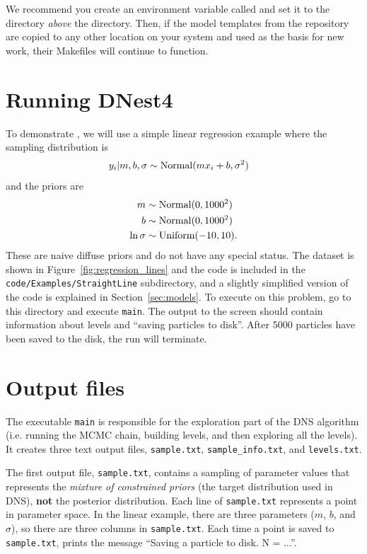 \documentclass[article, nojss]{jss}
\begin{document}
We recommend you create an environment variable called 
and set it to the directory {\em above} the  directory. Then,
if the model templates from the  repository are copied
to any other location on your system and used as the basis for
new work, their Makefiles will continue to function.

\section{Running DNest4}\label{sec:running}
To demonstrate ,
we will use a simple linear regression example where the
sampling distribution is
\begin{align}
y_i | m, b, \sigma &\sim \textnormal{Normal}(mx_i + b, \sigma^2)
\end{align}
and the priors are
\begin{align}
m &\sim \textnormal{Normal}(0, 1000^2)\\
b &\sim \textnormal{Normal}(0, 1000^2)\\
\ln\sigma &\sim \textnormal{Uniform}(-10, 10).
\end{align}
These are naive diffuse priors and do not have any special status.
The dataset is shown in Figure~\ref{fig:regression_lines}
and the code is included in the {\tt code/Examples/StraightLine}
subdirectory, and a slightly simplified version of the
code is explained in Section~\ref{sec:models}.
To execute  on this problem, go to this directory and
execute {\tt main}. The output to the screen
should contain information about levels and ``saving particles to disk''.
After 5000 particles have been saved to the disk, the run will terminate.

\section{Output files}
The executable {\tt main} is responsible for the exploration part of the
DNS algorithm (i.e. running the MCMC chain, building
levels, and then exploring all the levels). It creates three text output files,
{\tt sample.txt}, {\tt sample\_info.txt}, and {\tt levels.txt}.

The first output
file, {\tt sample.txt}, contains a sampling of parameter values that
represents the {\it mixture of constrained priors} (the target distribution
used in DNS), {\bf not} the
posterior distribution. Each line of {\tt sample.txt} represents a point in
parameter space. In the linear example, there are three parameters
($m$, $b$, and $\sigma$), so there
are three columns in {\tt sample.txt}.
Each time a point is saved to {\tt sample.txt},  prints
the message ``Saving a particle to disk. N = ...''.
\end{document}
